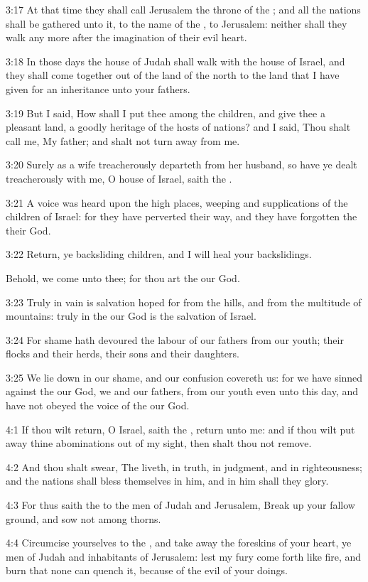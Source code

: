 3:17 At that time they shall call Jerusalem the throne of the \LORD; and all the nations shall be gathered unto it, to the name of the \LORD, to Jerusalem: neither shall they walk any more after the imagination of their evil heart.

3:18 In those days the house of Judah shall walk with the house of Israel, and they shall come together out of the land of the north to the land that I have given for an inheritance unto your fathers.

3:19 But I said, How shall I put thee among the children, and give thee a pleasant land, a goodly heritage of the hosts of nations? and I said, Thou shalt call me, My father; and shalt not turn away from me.

3:20 Surely as a wife treacherously departeth from her husband, so have ye dealt treacherously with me, O house of Israel, saith the \LORD.

3:21 A voice was heard upon the high places, weeping and supplications of the children of Israel: for they have perverted their way, and they have forgotten the \LORD their God.

3:22 Return, ye backsliding children, and I will heal your backslidings.

Behold, we come unto thee; for thou art the \LORD our God.

3:23 Truly in vain is salvation hoped for from the hills, and from the multitude of mountains: truly in the \LORD our God is the salvation of Israel.

3:24 For shame hath devoured the labour of our fathers from our youth; their flocks and their herds, their sons and their daughters.

3:25 We lie down in our shame, and our confusion covereth us: for we have sinned against the \LORD our God, we and our fathers, from our youth even unto this day, and have not obeyed the voice of the \LORD our God.

4:1 If thou wilt return, O Israel, saith the \LORD, return unto me: and if thou wilt put away thine abominations out of my sight, then shalt thou not remove.

4:2 And thou shalt swear, The \LORD liveth, in truth, in judgment, and in righteousness; and the nations shall bless themselves in him, and in him shall they glory.

4:3 For thus saith the \LORD to the men of Judah and Jerusalem, Break up your fallow ground, and sow not among thorns.

4:4 Circumcise yourselves to the \LORD, and take away the foreskins of your heart, ye men of Judah and inhabitants of Jerusalem: lest my fury come forth like fire, and burn that none can quench it, because of the evil of your doings.

